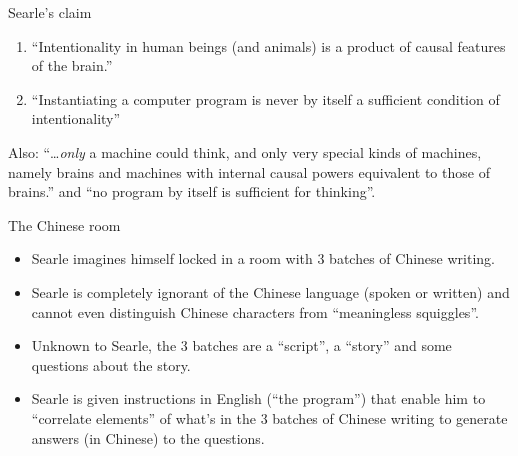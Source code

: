 \documentclass[10pt]{beamer}
\begin{document}
\begin{titledslide}{Searle's claim}


  \begin{enumerate}
  \item ``Intentionality in human beings (and animals) is a product of
    causal features of the brain.''
  \item ``Instantiating a computer program is never by itself a
    sufficient condition of intentionality''
  \end{enumerate}

  Also: ``\dots \emph{only} a machine could think, and only very
  special kinds of machines, namely brains and machines with internal
  causal powers equivalent to those of brains.'' and ``no program by
  itself is sufficient for thinking''.
  
\end{titledslide}
\begin{titledslide}{The Chinese room}


  \begin{itemize}
  \item Searle imagines himself locked in a room with 3 batches of
    Chinese writing.
  \item Searle is completely ignorant of the Chinese language (spoken
    or written) and cannot even distinguish Chinese characters from
    ``meaningless squiggles''.
  \item Unknown to Searle, the 3 batches are a ``script'', a ``story''
    and some questions about the story.
  \item Searle is given instructions in English (``the program'') that
    enable him to ``correlate elements'' of what's in the 3 batches of
    Chinese writing to generate answers (in Chinese) to the questions.
    
  \end{itemize}
  
\end{titledslide}
\end{document}
